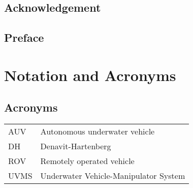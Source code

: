 \subsection*{Acknowledgement}

\clearpage


\subsection*{Preface}

\clearpage


\abstract


\clearpage


\section*{Notation and Acronyms}

\subsection*{Acronyms}
    \begin{longtable}{p{6cm}p{10cm}}
		AUV & Autonomous underwater vehicle
		\\
		DH & Denavit-Hartenberg 
		\\
		ROV & Remotely operated vehicle 
		\\
		UVMS & Underwater Vehicle-Manipulator System


    \end{longtable}
